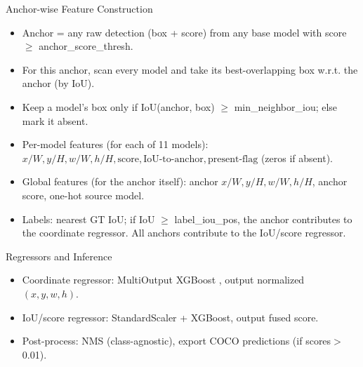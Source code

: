 \documentclass[aspectratio=169]{beamer}
\begin{document}
\begin{frame}{Anchor-wise Feature Construction}
\begin{itemize}
\item Anchor = any raw detection (box + score) from any base model with score $\ge$ \alert{anchor\_score\_thresh}.
\item For this anchor, scan \alert{every model} and take its \alert{best-overlapping} box w.r.t. the anchor (by IoU).
\item Keep a model’s box only if IoU(anchor, box) $\ge$ \alert{min\_neighbor\_iou}; else mark it \alert{absent}.
\item Per-model features (for each of 11 models):
\alert{$x/W, y/H, w/W, h/H, \text{score}, \text{IoU-to-anchor}, \text{present-flag}$}
(zeros if absent).
\item Global features (for the anchor itself):
\alert{anchor $x/W, y/H, w/W, h/H$, anchor score, one-hot source model}.
\item Labels:
nearest GT \alert{IoU}; if IoU $\ge$ \alert{label\_iou\_pos}, the anchor contributes to the \alert{coordinate regressor}.
All anchors contribute to the \alert{IoU/score regressor}.
\end{itemize}
\end{frame}
\begin{frame}{Regressors and Inference}
  \begin{itemize}
    \item \alert{Coordinate regressor}: MultiOutput \alert{XGBoost} , output normalized \((x,y,w,h)\).
    \item \alert{IoU/score regressor}: StandardScaler + \alert{XGBoost}, output fused score.
    \item Post-process: \alert{NMS} (class-agnostic), export COCO predictions (if scores$>$0.01).
  \end{itemize}
\end{frame}
\end{document}
